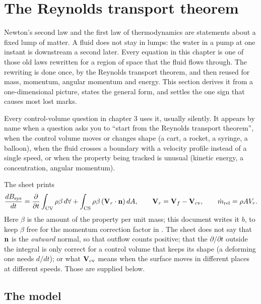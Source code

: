 \section{The Reynolds transport theorem}
\label{sec:rtt}

Newton's second law and the first law of thermodynamics are statements about a fixed lump of matter. A fluid does not stay in lumps: the water in a pump at one instant is downstream a second later. Every equation in this chapter is one of those old laws rewritten for a region of space that the fluid flows through. The rewriting is done once, by the Reynolds transport theorem, and then reused for mass, momentum, angular momentum and energy. This section derives it from a one-dimensional picture, states the general form, and settles the one sign that causes most lost marks.

\begin{recognise}
Every control-volume question in chapter 3 uses it, usually silently. It appears by name when a question asks you to ``start from the Reynolds transport theorem'', when the control volume moves or changes shape (a cart, a rocket, a syringe, a balloon), when the fluid crosses a boundary with a velocity profile instead of a single speed, or when the property being tracked is unusual (kinetic energy, a concentration, angular momentum).
\end{recognise}

\begin{onsheet}
The sheet prints
\[
\frac{dB_\text{sys}}{dt} = \frac{\partial }{\partial t}\int_\text{CV} \rho\beta \, d\forall + \int_\text{CS} \rho\beta\, (\mathbf{V}_r\cdot\mathbf{n})\, dA ,
\qquad \mathbf{V}_r = \mathbf{V}_f - \mathbf{V}_\text{cv},\qquad \dot m_\text{rel} = \rho A V_r .
\]
Here $\beta$ is the amount of the property per unit mass; this document writes it $b$, to keep $\beta$ free for the momentum correction factor in . The sheet does not say that $\mathbf{n}$ is the \emph{outward} normal, so that outflow counts positive; that the $\partial/\partial t$ outside the integral is only correct for a control volume that keeps its shape (a deforming one needs $d/dt$); or what $\mathbf{V}_\text{cv}$ means when the surface moves in different places at different speeds. Those are supplied below.
\end{onsheet}

\subsection*{The model}

